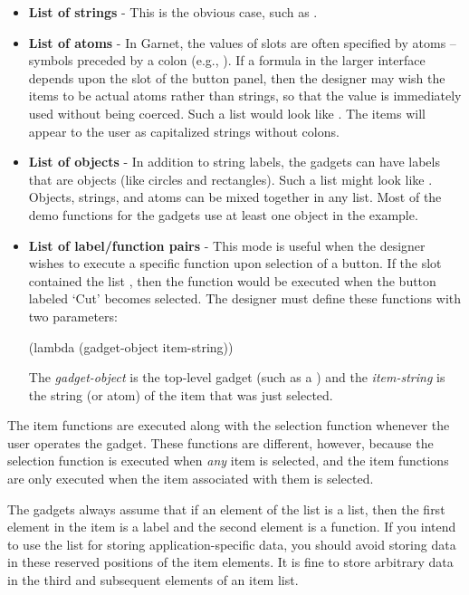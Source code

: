 \begin{itemize}
\item {\bf List of strings} - This is the obvious case, such as .

\item {\bf List of atoms} - In Garnet, the values of slots are often specified
by atoms -- symbols preceded by a colon (e.g., ).  If a
formula in the larger interface depends upon the  slot of
the button panel, then the designer may wish the items to be actual
atoms rather than strings, so that the value is immediately used
without being coerced.  Such a list would look like .  The items will appear to the user as capitalized
strings without colons.

\item {\bf List of objects} - In addition to string labels, the gadgets can have
labels that are objects (like circles and rectangles).  Such a list might
look like .  Objects, strings, and atoms
can be mixed together in any  list.  Most of the demo functions
for the gadgets use at least one object in the example.

\item {\bf List of label/function pairs} - This mode is
useful when the designer wishes to execute a specific function upon
selection of a button.  If the  slot contained the list
, then the function
 would be executed when the button labeled `Cut' becomes
selected.  The designer must define these functions with two parameters:
\begin{programexample}
(lambda (gadget-object item-string))
\end{programexample}
The {\it gadget-object} is the top-level gadget
(such as a ) and the {\it item-string} is the
string (or atom) of the item that was just selected.
\end{itemize}

The item functions are executed along with the selection function
whenever the user operates the gadget.  These functions are different,
however, because the selection function is executed when {\it any} item
is selected, and the item functions are only executed when the item
associated with them is selected.

The gadgets always assume that if an element of the  list is
a list, then the first element in the item is a label and the second element
is a function.  If you intend to use the  list for storing
application-specific data, you should avoid storing data in these reserved
positions of the item elements.  It is fine to store arbitrary data in the
third and subsequent elements of an item list.

